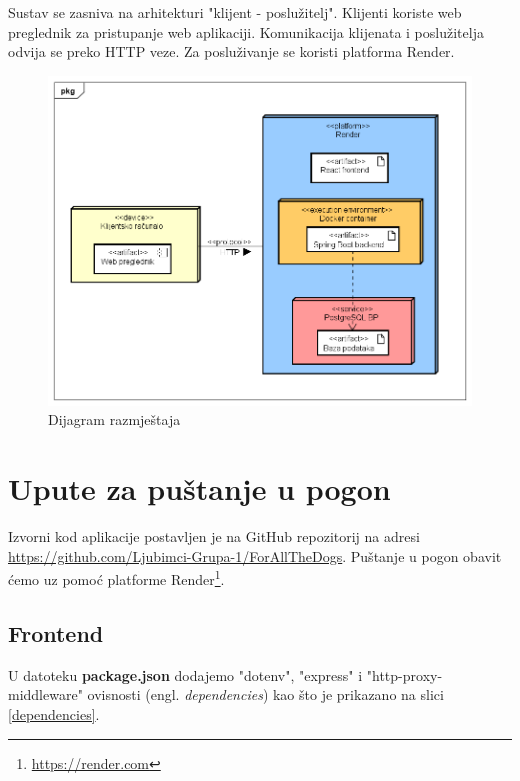 			Sustav se zasniva na arhitekturi "klijent - poslužitelj". Klijenti koriste web preglednik za pristupanje web aplikaciji. Komunikacija klijenata i poslužitelja odvija se preko HTTP veze. Za posluživanje se koristi platforma Render.
			 
			 \begin{figure}[H]
				\includegraphics[scale=0.6]{slike/dijagram_razmjestaja.PNG} 
				\centering
				\caption{Dijagram razmještaja}
				\label{dijagram_razmjestaja}
			\end{figure}
			
			\eject 
		
		\section{Upute za puštanje u pogon}
		
			Izvorni kod aplikacije postavljen je na GitHub repozitorij na adresi \url{https://github.com/Ljubimci-Grupa-1/ForAllTheDogs}. Puštanje u pogon obavit ćemo uz pomoć platforme Render\footnote{\url{https://render.com}}.
			
			\subsection{Frontend}
			
			U datoteku \textbf{package.json} dodajemo "dotenv", "express" i "http-proxy-middleware" ovisnosti (engl. \textit{dependencies}) kao što je prikazano na slici \ref{dependencies}.
			
